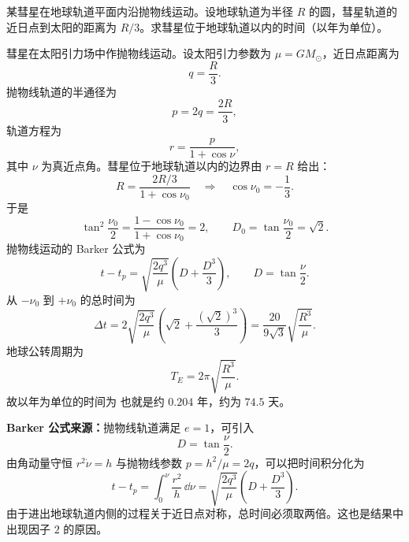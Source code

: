 \begin{question}[抛物线彗星的轨道时间]
某彗星在地球轨道平面内沿抛物线运动。设地球轨道为半径 $R$ 的圆，彗星轨道的近日点到太阳的距离为 $R/3$。求彗星位于地球轨道以内的时间（以年为单位）。

\begin{solution}
彗星在太阳引力场中作抛物线运动。设太阳引力参数为 $\mu=GM_\odot$，近日点距离为
\[
  q=\frac R3.
\]
抛物线轨道的半通径为
\[
  p=2q=\frac{2R}{3},
\]
轨道方程为
\[
  r=\frac{p}{1+\cos\nu},
\]
其中 $\nu$ 为真近点角。彗星位于地球轨道以内的边界由 $r=R$ 给出：
\[
  R=\frac{2R/3}{1+\cos\nu_0}
  \quad\Longrightarrow\quad
  \cos\nu_0=-\frac13.
\]
于是
\[
  \tan^2\frac{\nu_0}{2}
  =\frac{1-\cos\nu_0}{1+\cos\nu_0}=2,
  \qquad
  D_0=\tan\frac{\nu_0}{2}=\sqrt2 .
\]
抛物线运动的 Barker 公式为
\[
  t-t_p=\sqrt{\frac{2q^3}{\mu}}\left(D+\frac{D^3}{3}\right),
  \qquad D=\tan\frac\nu2 .
\]
从 $-\nu_0$ 到 $+\nu_0$ 的总时间为
\[
  \Delta t=2\sqrt{\frac{2q^3}{\mu}}
  \left(\sqrt2+\frac{(\sqrt2)^3}{3}\right)
  =\frac{20}{9\sqrt3}\sqrt{\frac{R^3}{\mu}}.
\]
地球公转周期为
\[
  T_E=2\pi\sqrt{\frac{R^3}{\mu}}.
\]
故以年为单位的时间为
也就是约 $0.204$ 年，约为 $74.5$ 天。


\medskip
\textbf{Barker 公式来源：}抛物线轨道满足 $e=1$，可引入
\[
  D=\tan\frac\nu2.
\]
由角动量守恒 $r^2\dot\nu=h$ 与抛物线参数 $p=h^2/\mu=2q$，可以把时间积分化为
\[
  t-t_p=\int_0^\nu \frac{r^2}{h}\,\dd\nu
  =\sqrt{\frac{2q^3}{\mu}}\left(D+\frac{D^3}{3}\right).
\]
由于进出地球轨道内侧的过程关于近日点对称，总时间必须取两倍。这也是结果中出现因子 $2$ 的原因。
\end{solution}

\end{question}

